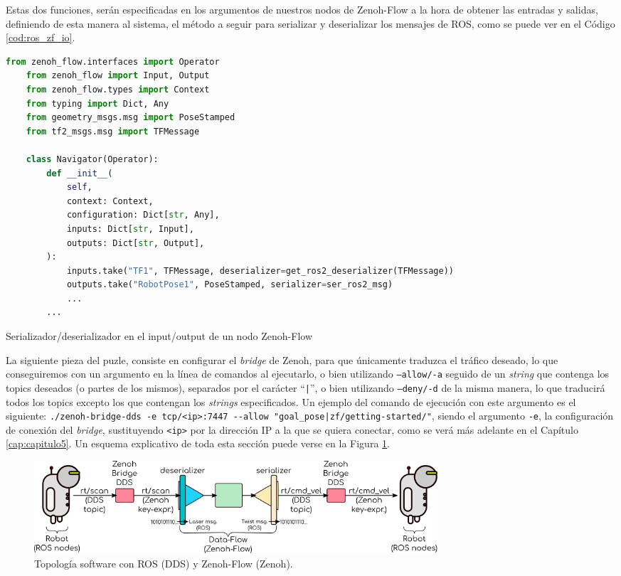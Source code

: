 Estas dos funciones, serán especificadas en los argumentos de nuestros nodos de
Zenoh-Flow a la hora de obtener las entradas y salidas, definiendo de esta
manera al sistema, el método a seguir para serializar y deserializar los
mensajes de ROS, como se puede ver en el Código \ref{cod:ros_zf_io}.
\\

\begin{code}[H]
  \begin{lstlisting}[language=Python]
    from zenoh_flow.interfaces import Operator
    from zenoh_flow import Input, Output
    from zenoh_flow.types import Context
    from typing import Dict, Any
    from geometry_msgs.msg import PoseStamped
    from tf2_msgs.msg import TFMessage

    class Navigator(Operator):
        def __init__(
            self,
            context: Context,
            configuration: Dict[str, Any],
            inputs: Dict[str, Input],
            outputs: Dict[str, Output],
        ):
            inputs.take("TF1", TFMessage, deserializer=get_ros2_deserializer(TFMessage))
            outputs.take("RobotPose1", PoseStamped, serializer=ser_ros2_msg)
            ...
        ...
  \end{lstlisting}
\caption[Serializador/deserializador en los input/output de un nodo Zenoh-Flow]{Serializador/deserializador en el input/output de un nodo Zenoh-Flow}
\label{cod:ros_zf_io}
\end{code}

La siguiente pieza del puzle, consiste en configurar el \textit{bridge} de
Zenoh, para que únicamente traduzca el tráfico deseado, lo que conseguiremos con
un argumento en la línea de comandos al ejecutarlo, o bien utilizando
\texttt{--allow/-a} seguido de un \textit{string} que contenga los topics
deseados (o partes de los mismos), separados por el carácter ``\texttt{|}'', o
bien utilizando \texttt{--deny/-d} de la misma manera, lo que traducirá todos
los topics excepto los que contengan los \textit{strings} especificados.
Un ejemplo del comando de ejecución con este argumento es el siguiente:
\verb+./zenoh-bridge-dds -e tcp/<ip>:7447 --allow "goal_pose|zf/getting-started/"+,
siendo el argumento \texttt{-e}, la configuración de conexión del
\textit{bridge}, sustituyendo \verb|<ip>| por la dirección IP a la que se quiera
conectar, como se verá más adelante en el Capítulo \ref{cap:capitulo5}.
Un esquema explicativo de toda esta sección puede verse en la Figura
\ref{fig:zenoh_dds_topology}.
\\

\begin{figure} [h!]
  \begin{center}
    \includegraphics[width=15cm]{figs/zenoh_dds_topology}
  \end{center}
  \caption{Topología software con ROS (DDS) y Zenoh-Flow (Zenoh).}
  \label{fig:zenoh_dds_topology}
\end{figure}\











